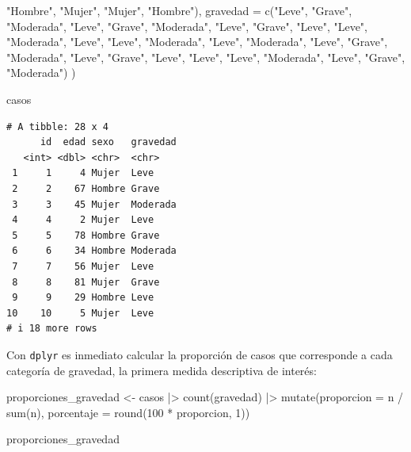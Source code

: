 \documentclass[
  spanish,
  a4paper,
]{scrreport}
\newenvironment{Shaded}{\begin{snugshade}}{\end{snugshade}}
\newcommand{\AttributeTok}[1]{\textcolor[rgb]{0.40,0.45,0.13}{#1}}
\newcommand{\DecValTok}[1]{\textcolor[rgb]{0.68,0.00,0.00}{#1}}
\newcommand{\FunctionTok}[1]{\textcolor[rgb]{0.28,0.35,0.67}{#1}}
\newcommand{\NormalTok}[1]{\textcolor[rgb]{0.00,0.23,0.31}{#1}}
\newcommand{\OtherTok}[1]{\textcolor[rgb]{0.00,0.23,0.31}{#1}}
\newcommand{\SpecialCharTok}[1]{\textcolor[rgb]{0.37,0.37,0.37}{#1}}
\newcommand{\StringTok}[1]{\textcolor[rgb]{0.13,0.47,0.30}{#1}}
\theoremstyle{definition}
\theoremstyle{definition}
\theoremstyle{remark}
\begin{document}
\begin{Shaded}
\begin{Highlighting}[]
           \StringTok{"Hombre"}\NormalTok{, }\StringTok{"Mujer"}\NormalTok{, }\StringTok{"Mujer"}\NormalTok{, }\StringTok{"Hombre"}\NormalTok{),}
  \AttributeTok{gravedad =} \FunctionTok{c}\NormalTok{(}\StringTok{"Leve"}\NormalTok{, }\StringTok{"Grave"}\NormalTok{, }\StringTok{"Moderada"}\NormalTok{, }\StringTok{"Leve"}\NormalTok{, }\StringTok{"Grave"}\NormalTok{, }\StringTok{"Moderada"}\NormalTok{, }\StringTok{"Leve"}\NormalTok{, }\StringTok{"Grave"}\NormalTok{,}
               \StringTok{"Leve"}\NormalTok{, }\StringTok{"Leve"}\NormalTok{, }\StringTok{"Moderada"}\NormalTok{, }\StringTok{"Leve"}\NormalTok{, }\StringTok{"Leve"}\NormalTok{, }\StringTok{"Moderada"}\NormalTok{, }\StringTok{"Leve"}\NormalTok{, }\StringTok{"Moderada"}\NormalTok{,}
               \StringTok{"Leve"}\NormalTok{, }\StringTok{"Grave"}\NormalTok{, }\StringTok{"Moderada"}\NormalTok{, }\StringTok{"Leve"}\NormalTok{, }\StringTok{"Grave"}\NormalTok{, }\StringTok{"Leve"}\NormalTok{, }\StringTok{"Leve"}\NormalTok{, }\StringTok{"Leve"}\NormalTok{,}
               \StringTok{"Moderada"}\NormalTok{, }\StringTok{"Leve"}\NormalTok{, }\StringTok{"Grave"}\NormalTok{, }\StringTok{"Moderada"}\NormalTok{)}
\NormalTok{)}

\NormalTok{casos}
\end{Highlighting}
\end{Shaded}

\begin{verbatim}
# A tibble: 28 x 4
      id  edad sexo   gravedad
   <int> <dbl> <chr>  <chr>   
 1     1     4 Mujer  Leve    
 2     2    67 Hombre Grave   
 3     3    45 Mujer  Moderada
 4     4     2 Mujer  Leve    
 5     5    78 Hombre Grave   
 6     6    34 Hombre Moderada
 7     7    56 Mujer  Leve    
 8     8    81 Mujer  Grave   
 9     9    29 Hombre Leve    
10    10     5 Mujer  Leve    
# i 18 more rows
\end{verbatim}

Con \texttt{dplyr} es inmediato calcular la proporción de casos que
corresponde a cada categoría de gravedad, la primera medida descriptiva
de interés:

\begin{Shaded}
\begin{Highlighting}[]
\NormalTok{proporciones\_gravedad }\OtherTok{\textless{}{-}}\NormalTok{ casos }\SpecialCharTok{|\textgreater{}}
  \FunctionTok{count}\NormalTok{(gravedad) }\SpecialCharTok{|\textgreater{}}
  \FunctionTok{mutate}\NormalTok{(}\AttributeTok{proporcion =}\NormalTok{ n }\SpecialCharTok{/} \FunctionTok{sum}\NormalTok{(n),}
         \AttributeTok{porcentaje =} \FunctionTok{round}\NormalTok{(}\DecValTok{100} \SpecialCharTok{*}\NormalTok{ proporcion, }\DecValTok{1}\NormalTok{))}

\NormalTok{proporciones\_gravedad}
\end{Highlighting}
\end{Shaded}
\end{document}
